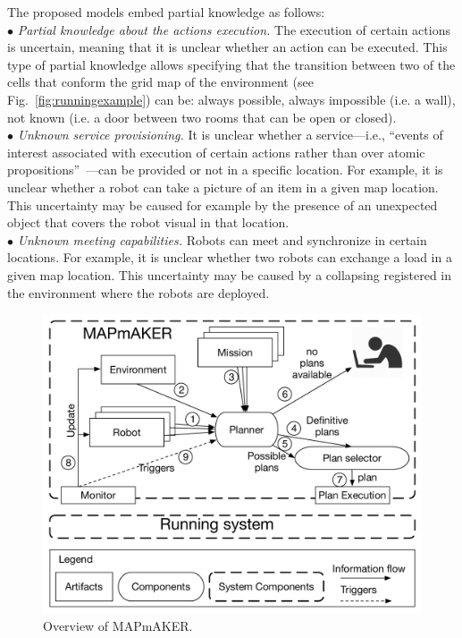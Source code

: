 The proposed models embed partial knowledge as follows:\\
$\bullet$  \emph{Partial knowledge about the actions execution.} 
The execution of certain actions is uncertain, meaning that it is unclear whether an action can be executed.
This type of partial knowledge allows specifying that the transition between two of the cells that conform the grid map of the environment (see Fig.~\ref{fig:runningexample}) can be:
always possible, always impossible (i.e. a wall), not known (i.e. a door between two rooms that can be open or closed).\\
$\bullet$ \emph{Unknown service provisioning.} 
It is unclear  whether a service---i.e.,  ``events of interest associated with execution of certain actions rather than over atomic propositions''~\cite{guo2015multi}---can be provided or not in a specific location. 
For example, it is unclear whether a robot can take a picture of an item in a given map location.
This  uncertainty may be caused for example by the presence of an unexpected object that covers the robot visual in that location.\\
$\bullet$ \emph{Unknown meeting capabilities.} Robots can meet and synchronize in certain locations.
For example, it is unclear whether two robots can exchange a load in a given map location.
This uncertainty may be caused by a collapsing registered in the environment where the robots are deployed.


\begin{figure}[t]
\begin{center}
\includegraphics[width=1\linewidth]{Figures/MAPmAKER.pdf}
\caption{Overview of  MAPmAKER.}
\label{fig:overview}
\end{center}
\end{figure}




